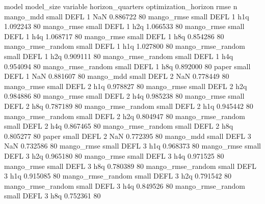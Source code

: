             model model_size variable  horizon_quarters optimization_horizon     rmse  n
        mango_mdd      small     DEFL                 1                  NaN 0.886722 80
       mango_rmse      small     DEFL                 1                  h1q 1.092243 80
       mango_rmse      small     DEFL                 1                  h2q 1.066533 80
       mango_rmse      small     DEFL                 1                  h4q 1.068717 80
       mango_rmse      small     DEFL                 1                  h8q 0.854286 80
mango_rmse_random      small     DEFL                 1                  h1q 1.027800 80
mango_rmse_random      small     DEFL                 1                  h2q 0.909111 80
mango_rmse_random      small     DEFL                 1                  h4q 0.954094 80
mango_rmse_random      small     DEFL                 1                  h8q 0.892000 80
            paper      small     DEFL                 1                  NaN 0.881607 80
        mango_mdd      small     DEFL                 2                  NaN 0.778449 80
       mango_rmse      small     DEFL                 2                  h1q 0.978827 80
       mango_rmse      small     DEFL                 2                  h2q 0.984886 80
       mango_rmse      small     DEFL                 2                  h4q 0.985238 80
       mango_rmse      small     DEFL                 2                  h8q 0.787189 80
mango_rmse_random      small     DEFL                 2                  h1q 0.945442 80
mango_rmse_random      small     DEFL                 2                  h2q 0.804947 80
mango_rmse_random      small     DEFL                 2                  h4q 0.867465 80
mango_rmse_random      small     DEFL                 2                  h8q 0.805277 80
            paper      small     DEFL                 2                  NaN 0.772395 80
        mango_mdd      small     DEFL                 3                  NaN 0.732586 80
       mango_rmse      small     DEFL                 3                  h1q 0.968373 80
       mango_rmse      small     DEFL                 3                  h2q 0.965180 80
       mango_rmse      small     DEFL                 3                  h4q 0.971525 80
       mango_rmse      small     DEFL                 3                  h8q 0.780389 80
mango_rmse_random      small     DEFL                 3                  h1q 0.915085 80
mango_rmse_random      small     DEFL                 3                  h2q 0.791542 80
mango_rmse_random      small     DEFL                 3                  h4q 0.849526 80
mango_rmse_random      small     DEFL                 3                  h8q 0.752361 80
